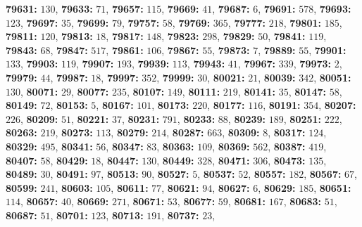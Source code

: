 \textsf{\bfseries 79631:} $130$, \textsf{\bfseries 79633:} $71$, \textsf{\bfseries 79657:} $115$, \textsf{\bfseries 79669:} $41$, \textsf{\bfseries 79687:} $6$, \textsf{\bfseries 79691:} $578$, \textsf{\bfseries 79693:} $123$, \textsf{\bfseries 79697:} $35$, \textsf{\bfseries 79699:} $79$, \textsf{\bfseries 79757:} $58$, \textsf{\bfseries 79769:} $365$, \textsf{\bfseries 79777:} $218$, \textsf{\bfseries 79801:} $185$, \textsf{\bfseries 79811:} $120$, \textsf{\bfseries 79813:} $18$, \textsf{\bfseries 79817:} $148$, \textsf{\bfseries 79823:} $298$, \textsf{\bfseries 79829:} $50$, \textsf{\bfseries 79841:} $119$, \textsf{\bfseries 79843:} $68$, \textsf{\bfseries 79847:} $517$, \textsf{\bfseries 79861:} $106$, \textsf{\bfseries 79867:} $55$, \textsf{\bfseries 79873:} $7$, \textsf{\bfseries 79889:} $55$, \textsf{\bfseries 79901:} $133$, \textsf{\bfseries 79903:} $119$, \textsf{\bfseries 79907:} $193$, \textsf{\bfseries 79939:} $113$, \textsf{\bfseries 79943:} $41$, \textsf{\bfseries 79967:} $339$, \textsf{\bfseries 79973:} $2$, \textsf{\bfseries 79979:} $44$, \textsf{\bfseries 79987:} $18$, \textsf{\bfseries 79997:} $352$, \textsf{\bfseries 79999:} $30$, \textsf{\bfseries 80021:} $21$, \textsf{\bfseries 80039:} $342$, \textsf{\bfseries 80051:} $130$, \textsf{\bfseries 80071:} $29$, \textsf{\bfseries 80077:} $235$, \textsf{\bfseries 80107:} $149$, \textsf{\bfseries 80111:} $219$, \textsf{\bfseries 80141:} $35$, \textsf{\bfseries 80147:} $58$, \textsf{\bfseries 80149:} $72$, \textsf{\bfseries 80153:} $5$, \textsf{\bfseries 80167:} $101$, \textsf{\bfseries 80173:} $220$, \textsf{\bfseries 80177:} $116$, \textsf{\bfseries 80191:} $354$, \textsf{\bfseries 80207:} $226$, \textsf{\bfseries 80209:} $51$, \textsf{\bfseries 80221:} $37$, \textsf{\bfseries 80231:} $791$, \textsf{\bfseries 80233:} $88$, \textsf{\bfseries 80239:} $189$, \textsf{\bfseries 80251:} $222$, \textsf{\bfseries 80263:} $219$, \textsf{\bfseries 80273:} $113$, \textsf{\bfseries 80279:} $214$, \textsf{\bfseries 80287:} $663$, \textsf{\bfseries 80309:} $8$, \textsf{\bfseries 80317:} $124$, \textsf{\bfseries 80329:} $495$, \textsf{\bfseries 80341:} $56$, \textsf{\bfseries 80347:} $83$, \textsf{\bfseries 80363:} $109$, \textsf{\bfseries 80369:} $562$, \textsf{\bfseries 80387:} $419$, \textsf{\bfseries 80407:} $58$, \textsf{\bfseries 80429:} $18$, \textsf{\bfseries 80447:} $130$, \textsf{\bfseries 80449:} $328$, \textsf{\bfseries 80471:} $306$, \textsf{\bfseries 80473:} $135$, \textsf{\bfseries 80489:} $30$, \textsf{\bfseries 80491:} $97$, \textsf{\bfseries 80513:} $90$, \textsf{\bfseries 80527:} $5$, \textsf{\bfseries 80537:} $52$, \textsf{\bfseries 80557:} $182$, \textsf{\bfseries 80567:} $67$, \textsf{\bfseries 80599:} $241$, \textsf{\bfseries 80603:} $105$, \textsf{\bfseries 80611:} $77$, \textsf{\bfseries 80621:} $94$, \textsf{\bfseries 80627:} $6$, \textsf{\bfseries 80629:} $185$, \textsf{\bfseries 80651:} $114$, \textsf{\bfseries 80657:} $40$, \textsf{\bfseries 80669:} $271$, \textsf{\bfseries 80671:} $53$, \textsf{\bfseries 80677:} $59$, \textsf{\bfseries 80681:} $167$, \textsf{\bfseries 80683:} $51$, \textsf{\bfseries 80687:} $51$, \textsf{\bfseries 80701:} $123$, \textsf{\bfseries 80713:} $191$, \textsf{\bfseries 80737:} $23$, 
